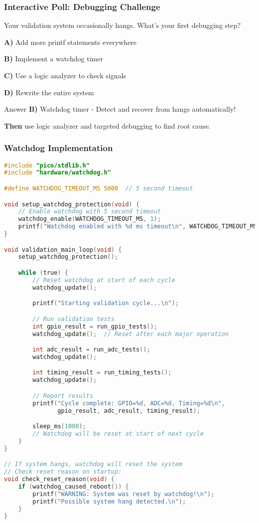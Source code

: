 \documentclass{beamer}
\begin{document}
\begin{frame}
\frametitle{Interactive Poll: Debugging Challenge}
\begin{center}
\Large Your validation system occasionally hangs. What's your first debugging step?
\end{center}

\textbf{A)} Add more printf statements everywhere

\textbf{B)} Implement a watchdog timer

\textbf{C)} Use a logic analyzer to check signals

\textbf{D)} Rewrite the entire system

\pause

\begin{alertblock}{Answer}
\textbf{B)} Watchdog timer - Detect and recover from hangs automatically!
\end{alertblock}

\vspace{0.5cm}
\textbf{Then} use logic analyzer and targeted debugging to find root cause.
\end{frame}

\begin{frame}[fragile]
\frametitle{Watchdog Implementation}
\begin{lstlisting}[language=C]
#include "pico/stdlib.h"
#include "hardware/watchdog.h"

#define WATCHDOG_TIMEOUT_MS 5000  // 5 second timeout

void setup_watchdog_protection(void) {
    // Enable watchdog with 5 second timeout
    watchdog_enable(WATCHDOG_TIMEOUT_MS, 1);
    printf("Watchdog enabled with %d ms timeout\n", WATCHDOG_TIMEOUT_MS);
}

void validation_main_loop(void) {
    setup_watchdog_protection();

    while (true) {
        // Reset watchdog at start of each cycle
        watchdog_update();

        printf("Starting validation cycle...\n");

        // Run validation tests
        int gpio_result = run_gpio_tests();
        watchdog_update();  // Reset after each major operation

        int adc_result = run_adc_tests();
        watchdog_update();

        int timing_result = run_timing_tests();
        watchdog_update();

        // Report results
        printf("Cycle complete: GPIO=%d, ADC=%d, Timing=%d\n",
               gpio_result, adc_result, timing_result);

        sleep_ms(1000);
        // Watchdog will be reset at start of next cycle
    }
}

// If system hangs, watchdog will reset the system
// Check reset reason on startup:
void check_reset_reason(void) {
    if (watchdog_caused_reboot()) {
        printf("WARNING: System was reset by watchdog!\n");
        printf("Possible system hang detected.\n");
    }
}
\end{lstlisting}
\end{frame}
\end{document}

